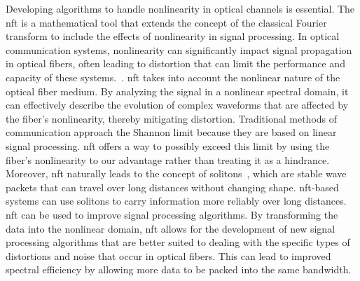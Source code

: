 Developing algorithms to handle nonlinearity in optical channels is essential. The \gls{nft} is a mathematical tool that extends the concept of the classical Fourier transform to include the effects of nonlinearity in signal processing. In optical communication systems, nonlinearity can significantly impact signal propagation in optical fibers, often leading to distortion that can limit the performance and capacity of these systems.~\cite{turitsyn2017nonlinear}.
\acrshort{nft} takes into account the nonlinear nature of the optical fiber medium. By analyzing the signal in a nonlinear spectral domain, it can effectively describe the evolution of complex waveforms that are affected by the fiber's nonlinearity, thereby mitigating distortion.
Traditional methods of communication approach the Shannon limit because they are based on linear signal processing. \acrshort{nft} offers a way to possibly exceed this limit by using the fiber's nonlinearity to our advantage rather than treating it as a hindrance. Moreover, \gls{nft} naturally leads to the concept of solitons~\cite{hasegawa1973}, which are stable wave packets that can travel over long distances without changing shape. \acrshort{nft}-based systems can use solitons to carry information more reliably over long distances. \gls{nft} can be used to improve signal processing algorithms. By transforming the data into the nonlinear domain, \acrshort{nft} allows for the development of new signal processing algorithms that are better suited to dealing with the specific types of distortions and noise that occur in optical fibers. This can lead to improved spectral efficiency by allowing more data to be packed into the same bandwidth. 






